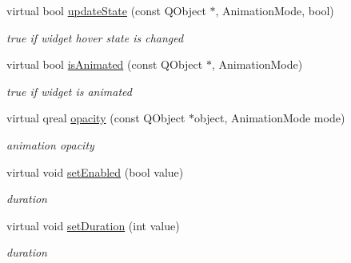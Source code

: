 \begin{DoxyCompactItemize}
virtual bool \hyperlink{class_widget_state_engine_a49fadff0e6704e5b151bf99beb6451d0}{update\+State} (const Q\+Object $\ast$, Animation\+Mode, bool)
\begin{DoxyCompactList}\small\item\em true if widget hover state is changed \end{DoxyCompactList}\item 
\mbox{\label{class_widget_state_engine_aa4833e643fa93cbf0ac544bab4a2023a}} 
virtual bool \hyperlink{class_widget_state_engine_aa4833e643fa93cbf0ac544bab4a2023a}{is\+Animated} (const Q\+Object $\ast$, Animation\+Mode)
\begin{DoxyCompactList}\small\item\em true if widget is animated \end{DoxyCompactList}\item 
\mbox{\label{class_widget_state_engine_a88a4f1f14d07bc07ec19416baa765981}} 
virtual qreal \hyperlink{class_widget_state_engine_a88a4f1f14d07bc07ec19416baa765981}{opacity} (const Q\+Object $\ast$object, Animation\+Mode mode)
\begin{DoxyCompactList}\small\item\em animation opacity \end{DoxyCompactList}\item 
\mbox{\label{class_widget_state_engine_a0d386eca284334fdd02f8ab83b285692}} 
virtual void \hyperlink{class_widget_state_engine_a0d386eca284334fdd02f8ab83b285692}{set\+Enabled} (bool value)
\begin{DoxyCompactList}\small\item\em duration \end{DoxyCompactList}\item 
\mbox{\label{class_widget_state_engine_ade26f525f072a7c6b6960ce70276a8f4}} 
virtual void \hyperlink{class_widget_state_engine_ade26f525f072a7c6b6960ce70276a8f4}{set\+Duration} (int value)
\begin{DoxyCompactList}\small\item\em duration \end{DoxyCompactList}\end{DoxyCompactItemize}
